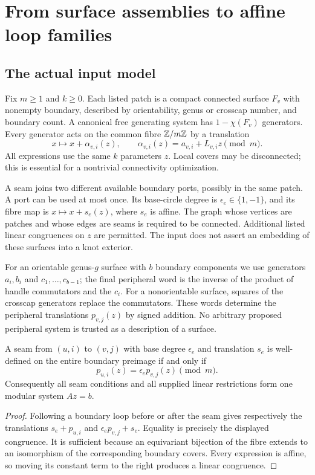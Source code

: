 \section{From surface assemblies to affine loop families}
\label{sec:surface-families}

\subsection{The actual input model}

Fix $m\ge1$ and $k\ge0$. Each listed patch is a compact connected surface
$F_v$ with nonempty boundary, described by orientability, genus or crosscap
number, and boundary count. A canonical free generating system has
$1-\chi(F_v)$ generators. Every generator acts on the common fibre
$\mathbb Z/m\mathbb Z$ by a translation
\[
 x\longmapsto x+\alpha_{v,i}(z),\qquad
 \alpha_{v,i}(z)=a_{v,i}+L_{v,i}z\pmod m.
\]
All expressions use the same $k$ parameters $z$. Local covers may be
disconnected; this is essential for a nontrivial connectivity optimization.

A seam joins two different available boundary ports, possibly in the same
patch. A port can be used at most once. Its base-circle degree is
$\epsilon_e\in\{1,-1\}$, and its fibre map is
$x\mapsto x+s_e(z)$, where $s_e$ is affine. The graph whose vertices are
patches and whose edges are seams is required to be connected. Additional
listed linear congruences on $z$ are permitted. The input does not
assert an embedding of these surfaces into a knot exterior.

For an orientable genus-$g$ surface with $b$ boundary components we use
generators $a_i,b_i$ and $c_1,\ldots,c_{b-1}$; the final peripheral word
is the inverse of the product of handle commutators and the $c_i$.
For a nonorientable surface, squares of the crosscap generators replace
the commutators. These words determine the peripheral translations
$p_{v,j}(z)$ by signed addition. No arbitrary proposed peripheral system
is trusted as a description of a surface.

\begin{lemma}
\label{lem:seam-equations}
A seam from $(u,i)$ to $(v,j)$ with base degree $\epsilon_e$ and
translation $s_e$ is well-defined on the entire boundary preimage if and
only if
\[
 p_{u,i}(z)=\epsilon_e p_{v,j}(z)\pmod m.
\]
Consequently all seam conditions and all supplied linear restrictions
form one modular system $Az=b$.
\end{lemma}
\begin{proof}
Following a boundary loop before or after the seam gives respectively
the translations $s_e+p_{u,i}$ and $\epsilon_e p_{v,j}+s_e$.
Equality is precisely the displayed congruence. It is sufficient because
an equivariant bijection of the fibre extends to an isomorphism of the
corresponding boundary covers. Every expression is affine, so moving its
constant term to the right produces a linear congruence.
\end{proof}

